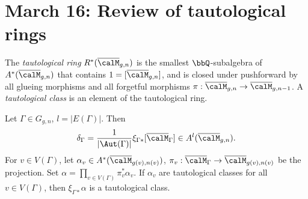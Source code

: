 \section{March 16: Review of tautological rings}

\begin{definition}
  The \emph{tautological ring} $R^*(\overline{\calM}_{g,n})$ is the smallest $\bbQ$-subalgebra of $A^*(\overline{\calM}_{g,n})$ that contains $1 = [\overline{\calM}_{g,n}]$, and is closed under pushforward by all glueing morphisms \Yang{} and all forgetful morphisms $\pi: \overline{\calM}_{g,n} \to \overline{\calM}_{g,n-1}$.
  A \emph{tautological class} is an element of the tautological ring.
\end{definition}

  Let $\Gamma \in G_{g,n}$, $l = |E(\Gamma)|$.
  Then 
  \[ \delta_\Gamma = \frac{1}{|\Aut(\Gamma)|} \xi_{\Gamma*} [\overline{\calM}_\Gamma] \in A^l(\overline{\calM}_{g,n}). \]
  For $v \in V(\Gamma)$, let $\alpha_v \in A^*(\overline{\calM}_{g(v),n(v)})$, $\pi_v: \overline{\calM}_\Gamma \to \overline{\calM}_{g(v),n(v)}$ be the projection.
  Set $\alpha = \prod_{v \in V(\Gamma)} \pi_v^* \alpha_v$.
  If $\alpha_v$ are tautological classes for all $v \in V(\Gamma)$, then $\xi_{\Gamma*} \alpha$ is a tautological class.

  

